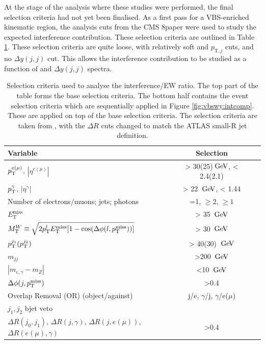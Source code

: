 At the stage of the analysis where these studies were performed, the final selection criteria had not yet been finalised. As a first pass for a VBS-enriched kinematic region, the analysis cuts from the CMS 8\TeV \ewwy paper \cite{VBSWy:CMSVBSWy} were used to study the expected interference contribution. These selection criteria are outlined in Table \ref{tab:vbswy:interferencecuts}. These selection criteria are quite loose, with relatively soft \mjj and $p_{\text{T},j}$ cuts, and no $\Delta y(j,j)$ cut. This allows the interference contribution to be studied as a function of \mjj and $\Delta y(j,j)$ spectra.

\begin{table}[t]
  \centering
  \caption{\label{tab:vbswy:interferencecuts} Selection criteria used to analyse the interference/EW ratio. The top part of the table forms the base selection criteria. The bottom half contains the event selection criteria which are sequentially applied in Figure \ref{fig:vbswy:intcomp}. These are applied on top of the base selection criteria. The selection criteria are taken from \cite{VBSWy:CMSVBSWy}, with the $\Delta R$ cuts changed to match the ATLAS small-R jet definition.}
  \begin{tabular}{l c c c}
  \hline
  Variable & Selection \\ \hline
  $p_{\text{T}}^{e(\mu)}$, $|\eta^{e(\mu)}|$&> 30(25)$\hspace{2pt}\text{Ge\kern -0.1em V}$, < 2.4(2.1) \\
  $p_{\text{T}}^{\gamma}$, $|\eta^{\gamma}|$&> 22 $\hspace{2pt}\text{Ge\kern -0.1em V}$, < 1.44\\
  Number of electrons/muons; jets; photons & =1, $\geq2$, $\geq1$ \\
  $E_\mathrm{T}^{\mathrm{miss}}$&> 35 $\hspace{2pt}\text{Ge\kern -0.1em V}$ \\
  $M^{W}_{\mathrm{T}}\equiv\sqrt{2p_{\text{T}}^{l}E_\mathrm{T}^{\mathrm{miss}}[1-\cos(\Delta\phi(l,p_{\text{T}}^{\mathrm{miss}}))]}$ & > 30 $\hspace{2pt}\text{Ge\kern -0.1em V}$ \\
  $p_{\text{T}}^{j_1}(p_{\text{T}}^{j_2})$ & > 40(30) $\hspace{2pt}\text{Ge\kern -0.1em V}$ \\ \hline\hline
  $m_{jj}$ & >200 $\hspace{2pt}\text{Ge\kern -0.1em V}$\\
  $|m_{e,\gamma}-m_{Z}|$ & <10 $\hspace{2pt}\text{Ge\kern -0.1em V}$ \\
  $\Delta\phi(j,p_{\text{T}}^{\mathrm{miss}})$ & >0.4 \\
  Overlap Removal (OR) (object/against) & j/e, $\gamma$/j, $\gamma$/e($\mu$) \\
  $j_1, j_2$ bjet veto & \\
  $\Delta R(j_0,j_1)$, $\Delta R(j,\gamma)$, $\Delta R(j,e(\mu))$, $\Delta R(e(\mu),\gamma)$ & >0.4 \\
  \hline
  \end{tabular}
\end{table}  

